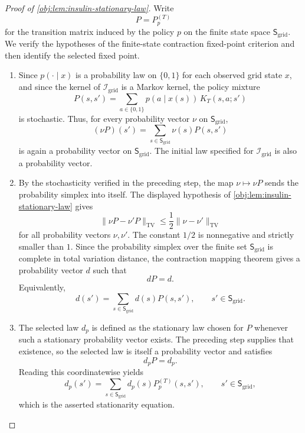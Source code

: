 \begin{proof}[Proof of \cref{obj:lem:insulin-stationary-law}]
Write
\[
P=P_p^{(T)}
\]
for the transition matrix induced by the policy \(p\) on the finite state space
\(\mathsf S_{\mathrm{grid}}\). We verify the hypotheses of the finite-state
contraction fixed-point criterion and then identify the selected fixed point.

\begin{enumerate}
\item Since \(p(\cdot\mid x)\) is a probability law on \(\{0,1\}\) for each
observed grid state \(x\), and since the kernel of \(\mathcal I_{\mathrm{grid}}\)
is a Markov kernel, the policy mixture
\[
P(s,s')
=
\sum_{a\in\{0,1\}} p(a\mid x(s))\,K_T(s,a;s')
\]
is stochastic. Thus, for every probability vector \(\nu\) on
\(\mathsf S_{\mathrm{grid}}\),
\[
(\nu P)(s')=\sum_{s\in\mathsf S_{\mathrm{grid}}}\nu(s)P(s,s')
\]
is again a probability vector on \(\mathsf S_{\mathrm{grid}}\). The initial law specified for \(\mathcal I_{\mathrm{grid}}\) is also a probability
vector. %

\item By the stochasticity verified in the preceding step, the map
\(\nu\mapsto \nu P\) sends the probability simplex into itself. The displayed
hypothesis of \cref{obj:lem:insulin-stationary-law} gives
\[
\|\nu P-\nu'P\|_{\mathrm{TV}}
\le
\frac12\|\nu-\nu'\|_{\mathrm{TV}}
\]
for all probability vectors \(\nu,\nu'\). The constant \(1/2\) is nonnegative
and strictly smaller than \(1\). Since the probability simplex over the finite
set \(\mathsf S_{\mathrm{grid}}\) is complete in total variation distance, the
contraction mapping theorem gives a probability vector \(d\) such that
\[
dP=d .
\]
Equivalently,
\[
d(s')=\sum_{s\in\mathsf S_{\mathrm{grid}}}d(s)P(s,s'),
\qquad s'\in\mathsf S_{\mathrm{grid}} .
\]

\item The selected law \(d_p\) is defined as the stationary law chosen for
\(P\) whenever such a stationary probability vector exists. The preceding step
supplies that existence, so the selected law is itself a probability vector and
satisfies
\[
d_pP=d_p .
\]
Reading this coordinatewise yields
\[
d_p(s')
=
\sum_{s\in\mathsf S_{\mathrm{grid}}}d_p(s)P_p^{(T)}(s,s'),
\qquad s'\in\mathsf S_{\mathrm{grid}} ,
\]
which is the asserted stationarity equation. %
\end{enumerate}
\end{proof}
